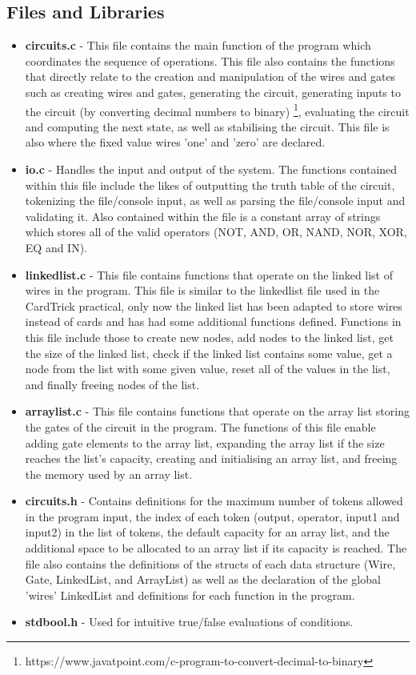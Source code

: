 \documentclass[11]{article}
\begin{document}
		\subsection{Files and Libraries}
				\begin{itemize}
					\item \textbf{circuits.c} - This file contains the main function of the program which coordinates the sequence of operations. This file also contains the functions that directly relate to the creation and manipulation of the wires and gates such as creating wires and gates, generating the circuit, generating inputs to the circuit (by converting decimal numbers to binary) \footnote{https://www.javatpoint.com/c-program-to-convert-decimal-to-binary}, evaluating the circuit and computing the next state, as well as stabilising the circuit. This file is also where the fixed value wires 'one' and 'zero' are declared.
					\item \textbf{io.c} - Handles the input and output of the system. The functions contained within this file include the likes of outputting the truth table of the circuit, tokenizing the file/console input, as well as parsing the file/console input and validating it. Also contained within the file is a constant array of strings which stores all of the valid operators (NOT, AND, OR, NAND, NOR, XOR, EQ and IN).
					\item \textbf{linkedlist.c} - This file contains functions that operate on the linked list of wires in the program. This file is similar to the linkedlist file used in the CardTrick practical, only now the linked list has been adapted to store wires instead of cards and has had some additional functions defined. Functions in this file include those to create new nodes, add nodes to the linked list, get the size of the linked list, check if the linked list contains some value, get a node from the list with some given value, reset all of the values in the list, and finally freeing nodes of the list.
					\item \textbf{arraylist.c} - This file contains functions that operate on the array list storing the gates of the circuit in the program. The functions of this file enable adding gate elements to the array list, expanding the array list if the size reaches the list's capacity, creating and initialising an array list, and freeing the memory used by an array list.
					\item \textbf{circuits.h} - Contains definitions for the maximum number of tokens allowed in the program input, the index of each token (output, operator, input1 and input2) in the list of tokens, the default capacity for an array list, and the additional space to be allocated to an array list if its capacity is reached. The file also contains the definitions of the structs of each data structure (Wire, Gate, LinkedList, and ArrayList) as well as the declaration of the global 'wires' LinkedList and definitions for each function in the program.
					\item \textbf{stdbool.h} - Used for intuitive true/false evaluations of conditions.
					

\end{itemize}
\end{document}
